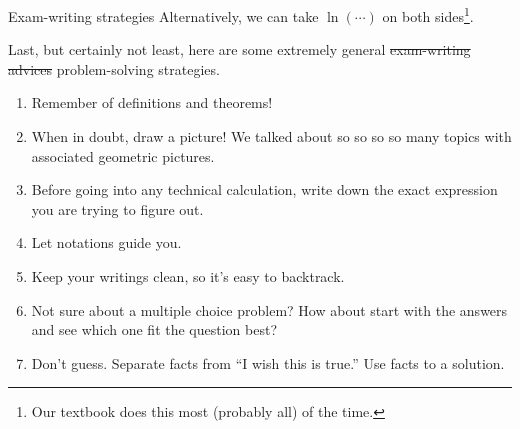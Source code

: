 \documentclass[../main.tex]{subfiles}
\begin{document}
\begin{lesson}{Exam-writing strategies}
  Alternatively, we can take \(\ln( \cdots{} )\) on both sides\footnote{Our textbook does this most (probably all) of the time.}.

  \clearpage

  Last, but certainly not least, here are some extremely general \sout{exam-writing advices} problem-solving strategies.

  \begin{enumerate}
    \item Remember  of definitions and theorems!
    \item When in doubt, draw a picture! We talked about so so so so many topics with associated geometric pictures.
    \item Before going into any technical calculation, write down the exact expression you are trying to figure out.
    \item Let notations guide you. 
    \item Keep your writings clean, so it's easy to backtrack.
    \item Not sure about a multiple choice problem? How about start with the answers and see which one fit the question best?
    \item Don't guess. Separate facts from ``I wish this is true.'' Use facts to  a solution.
  \end{enumerate}
\end{lesson}
\end{document}
